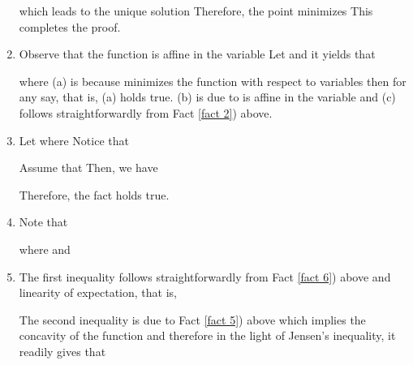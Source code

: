 \documentclass[journal]{IEEEtran}
\begin{document}
\begin{IEEEproof}
\begin{enumerate}
    which leads to the unique solution 
    Therefore, the point  minimizes  This completes the proof.










\item Observe that the function  is affine in the variable  Let  and it yields that
    
    where (a) is because  minimizes the function  with respect to variables  then for any  say,  that is, (a) holds true. (b) is due to  is affine in the variable  and (c) follows straightforwardly from Fact \ref{fact 2}) above.


\item Let  where  Notice that
    
    Assume that  Then, we have
    
    Therefore, the fact holds true.
\item Note that
    
    where  and  
\item The first inequality follows straightforwardly from Fact \ref{fact 6}) above and linearity of expectation, that is,
    
    The second inequality is due to Fact \ref{fact 5}) above which implies the concavity of the function 
    and therefore in the light of Jensen's inequality, it readily gives that
    




\iffalse
\item Note that  can be viewed as the covariance matrices of the sequential Kalman filter, then the mean squared error may be minimized by minimizing the trace of  Then we calculate the differentials of  with respect to matrix variables   in the following:
    
    implying that
    
    Let the derivative above be zero, so that
    
    Now, we calculate the differential of  with respect to matrix variables 
    
    implying that
    
    Setting the derivative above be zero yields that
    
    Therefore, given any  the point   is the unique critical point of the function 
\fi
\end{enumerate}
\end{IEEEproof}
\end{document}
